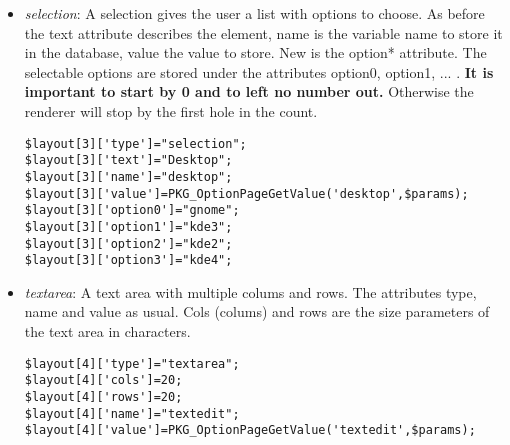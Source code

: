 \begin{itemize}
\item \textit{selection}: A selection gives the user a list with options to choose. As before the text attribute describes the element, name is the variable name to store it in the database, value the value to store. New is the option* attribute. The selectable options are stored under the attributes option0, option1, ... . \textbf{It is important to start by 0 and to left no number out.} Otherwise the renderer will stop by the first hole in the count.
\begin{verbatim}
$layout[3]['type']="selection";
$layout[3]['text']="Desktop";
$layout[3]['name']="desktop";
$layout[3]['value']=PKG_OptionPageGetValue('desktop',$params);
$layout[3]['option0']="gnome";
$layout[3]['option1']="kde3";
$layout[3]['option2']="kde2";
$layout[3]['option3']="kde4";
\end{verbatim}


\item \textit{textarea}: A text area with multiple colums and rows. The attributes type, name and value as usual. Cols (colums) and rows are the size parameters of the text area in characters.
\begin{verbatim}
$layout[4]['type']="textarea";
$layout[4]['cols']=20;
$layout[4]['rows']=20;
$layout[4]['name']="textedit";
$layout[4]['value']=PKG_OptionPageGetValue('textedit',$params);
\end{verbatim}
\end{itemize}
